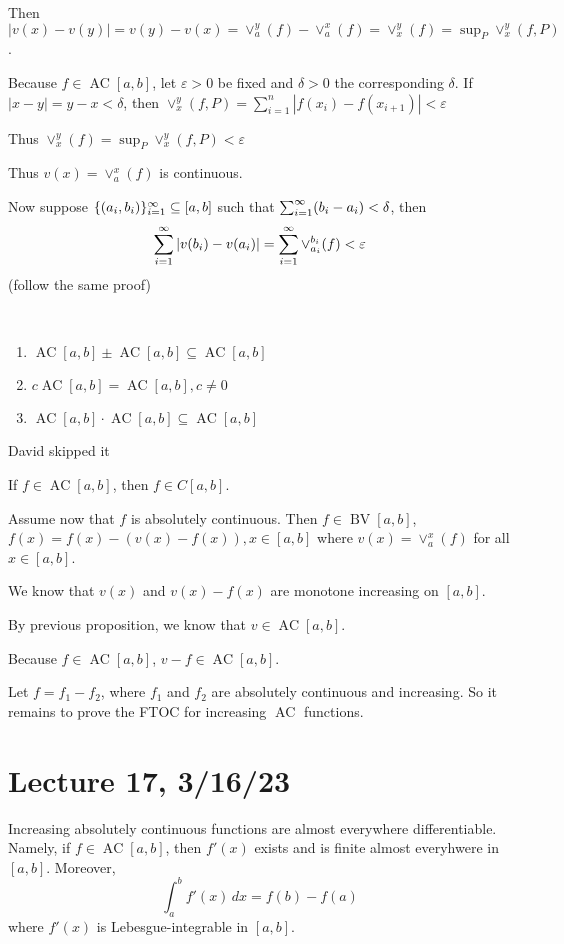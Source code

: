 \documentclass[x11names,reqno,14pt]{extarticle}
\newcommand{\seq}[2][\oo]{_{#2 = 1}^#1}
\DeclareMathOperator{\BV}{BV}
\DeclareMathOperator{\AC}{AC}
\begin{document}
Then $|v(x) - v(y)| = v(y) - v(x) = \vee_a^y(f) - \vee_a^x(f) = \vee_x^y(f) = \sup_{P}\vee_x^y(f, P)$. 

Because $f \in \AC[a,b]$, let $\varepsilon>0$ be fixed and $\delta>0$ the corresponding $\delta$. If $|x - y| = y - x < \delta$, then $\vee_x^y(f, P) = \sum_{i=1}^n|f(x_i) - f(x_{i + 1})|<\varepsilon$

Thus $\vee_x^y(f) = \sup_P\vee_x^y(f, P) < \varepsilon$

Thus $v(x) = \vee_a^x(f)$ is continuous. 

Now suppose $\{(a_i, b_i)\}\seq{i} \subseteq[a,b]$ such that $\sum\seq{i}(b_i - a_i) < \delta$, then 
\[
\sum\seq{i}|v(b_i) - v(a_i)| = \sum\seq{i}\vee_{a_i}^{b_i}(f) < \varepsilon
\]
(follow the same proof)

\prop\,
\begin{enumerate}

\item $\AC[a,b]\pm\AC[a,b] \subseteq \AC[a,b]$

\item $c\AC[a,b] = \AC[a, b], c \neq 0$ 

\item $\AC[a,b] \cdot \AC[a,b] \subseteq \AC[a,b]$

\end{enumerate}

\proof

David skipped it

\rem If $f \in \AC[a,b]$, then $f \in C[a, b]$. 

Assume now that $f$ is absolutely continuous. Then $f \in \BV[a,b]$, $f(x) = f(x) - (v(x) - f(x)), x \in [a, b]$ where $v(x) = \vee_a^x(f)$ for all $x \in [a,b]$.

We know that $v(x)$ and $v(x) - f(x)$ are monotone increasing on $[a, b]$. 

By previous proposition, we know that $v \in \AC[a,b]$.

Because $f \in \AC[a,b]$, $v - f \in \AC[a,b]$. 

Let $f = f_1 - f_2$, where $f_1$ and $f_2$ are absolutely continuous and increasing. So it remains to prove the FTOC for increasing $\AC$ functions.

\section*{Lecture 17, 3/16/23}

\thm

Increasing absolutely continuous functions are almost everywhere differentiable. Namely, if $f \in \AC[a,b]$, then $f'(x)$ exists and is finite almost everyhwere in $[a, b]$. Moreover, 
\[
\int_a^bf'(x)\,dx = f(b) - f(a)
\]
where $f'(x)$ is Lebesgue-integrable in $[a, b]$. 
\end{document}
